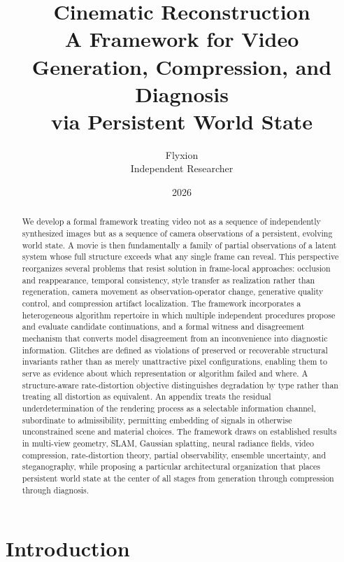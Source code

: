 \documentclass[12pt,a4paper]{article}
\title{\textbf{Cinematic Reconstruction}\\[4pt]
\large A Framework for Video Generation, Compression, and Diagnosis\\
via Persistent World State}
\author{Flyxion\\[2pt]
\small Independent Researcher}
\date{2026}
\theoremstyle{plain}
\theoremstyle{definition}
\theoremstyle{remark}
\begin{document}
\maketitle
\thispagestyle{empty}

\begin{abstract}
We develop a formal framework treating video not as a sequence of independently synthesized images but as a sequence of camera observations of a persistent, evolving world state. A movie is then fundamentally a family of partial observations of a latent system whose full structure exceeds what any single frame can reveal. This perspective reorganizes several problems that resist solution in frame-local approaches: occlusion and reappearance, temporal consistency, style transfer as realization rather than regeneration, camera movement as observation-operator change, generative quality control, and compression artifact localization. The framework incorporates a heterogeneous algorithm repertoire in which multiple independent procedures propose and evaluate candidate continuations, and a formal witness and disagreement mechanism that converts model disagreement from an inconvenience into diagnostic information. Glitches are defined as violations of preserved or recoverable structural invariants rather than as merely unattractive pixel configurations, enabling them to serve as evidence about which representation or algorithm failed and where. A structure-aware rate-distortion objective distinguishes degradation by type rather than treating all distortion as equivalent. An appendix treats the residual underdetermination of the rendering process as a selectable information channel, subordinate to admissibility, permitting embedding of signals in otherwise unconstrained scene and material choices. The framework draws on established results in multi-view geometry, SLAM, Gaussian splatting, neural radiance fields, video compression, rate-distortion theory, partial observability, ensemble uncertainty, and steganography, while proposing a particular architectural organization that places persistent world state at the center of all stages from generation through compression through diagnosis.
\end{abstract}

\newpage
\tableofcontents
\newpage

\section{Introduction}
\end{document}
